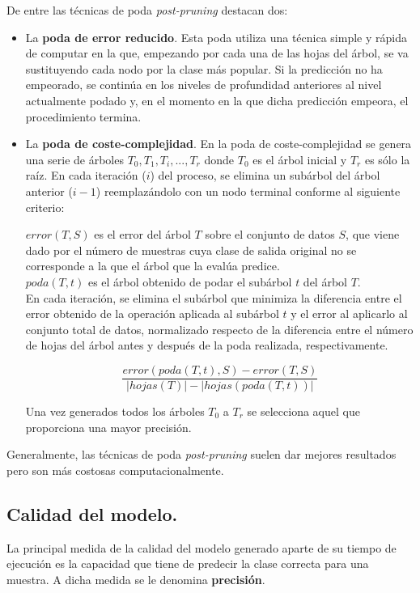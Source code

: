 De entre las técnicas de poda \textit{post-pruning} destacan dos:\\
\begin{itemize}
\item La \textbf{poda de error reducido}. Esta poda utiliza una técnica simple y rápida de computar en la que, empezando por cada una de las hojas del árbol, se va sustituyendo cada nodo por la clase más popular. Si la predicción no ha empeorado, se continúa en los niveles de profundidad anteriores al nivel actualmente podado y, en el momento en la que dicha predicción empeora, el procedimiento termina.\\

\item La \textbf{poda de coste-complejidad}. En la poda de coste-complejidad se genera una serie de árboles $T_0, T_1, T_i, ... , T_r$ donde $T_0$ es el árbol inicial y $T_r$ es sólo la raíz. En cada iteración ($i$) del proceso, se elimina un subárbol del árbol anterior ($i-1$) reemplazándolo con un nodo terminal conforme al siguiente criterio:

$error(T, S)$ es el error del árbol $T$ sobre el conjunto de datos $S$, que viene dado por el número de muestras cuya clase de salida original no se corresponde a la que el árbol que la evalúa predice.\\ $poda(T, t)$ es el árbol obtenido de podar el subárbol $t$ del árbol $T$.\\

En cada iteración, se elimina el subárbol que minimiza la diferencia entre el error obtenido de la operación aplicada al subárbol $t$ y el error al aplicarlo al conjunto total de datos, normalizado respecto de la diferencia entre el número de hojas del árbol antes y después de la poda realizada, respectivamente.

$$
\frac{error(poda(T, t), S) - error(T, S)}{|hojas(T)| - |hojas(poda(T, t))|}
$$

Una vez generados todos los árboles $T_0$ a $T_r$ se selecciona aquel que proporciona una mayor precisión.\\

\end{itemize}
Generalmente, las técnicas de poda \textit{post-pruning} suelen dar mejores resultados pero son más costosas computacionalmente.
\subsection{Calidad del modelo.}
La principal medida de la calidad del modelo generado aparte de su tiempo de ejecución es la capacidad que tiene de predecir la clase correcta para una muestra. A dicha medida se le denomina \textbf{precisión}.

